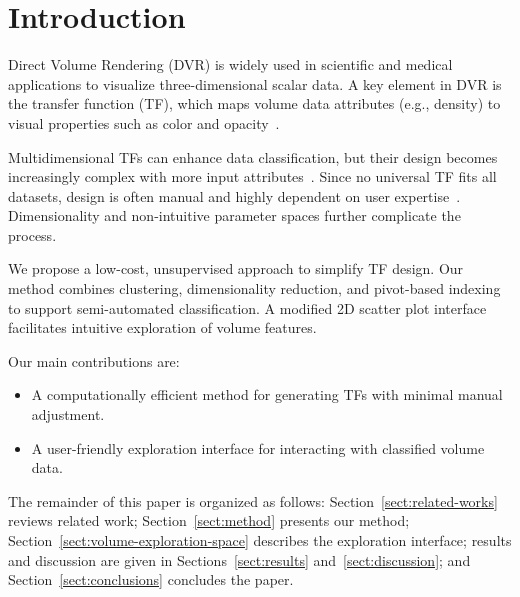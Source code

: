 \section{Introduction}
\label{sect:introduction}

Direct Volume Rendering (DVR) is widely used in scientific and medical applications to visualize three-dimensional scalar data. A key element in DVR is the transfer function (TF), which maps volume data attributes (e.g., density) to visual properties such as color and opacity~\cite{ljung2016}.

Multidimensional TFs can enhance data classification, but their design becomes increasingly complex with more input attributes~\cite{ljung2016, pan2024}. Since no universal TF fits all datasets, design is often manual and highly dependent on user expertise~\cite{arens2010}. Dimensionality and non-intuitive parameter spaces further complicate the process.

We propose a low-cost, unsupervised approach to simplify TF design. Our method combines clustering, dimensionality reduction, and pivot-based indexing to support semi-automated classification. A modified 2D scatter plot interface facilitates intuitive exploration of volume features.

Our main contributions are:

\begin{itemize}
    \item A computationally efficient method for generating TFs with minimal manual adjustment.
    \item A user-friendly exploration interface for interacting with classified volume data.
\end{itemize}

The remainder of this paper is organized as follows: Section~\ref{sect:related-works} reviews related work; Section~\ref{sect:method} presents our method; Section~\ref{sect:volume-exploration-space} describes the exploration interface; results and discussion are given in Sections~\ref{sect:results} and~\ref{sect:discussion}; and Section~\ref{sect:conclusions} concludes the paper.
